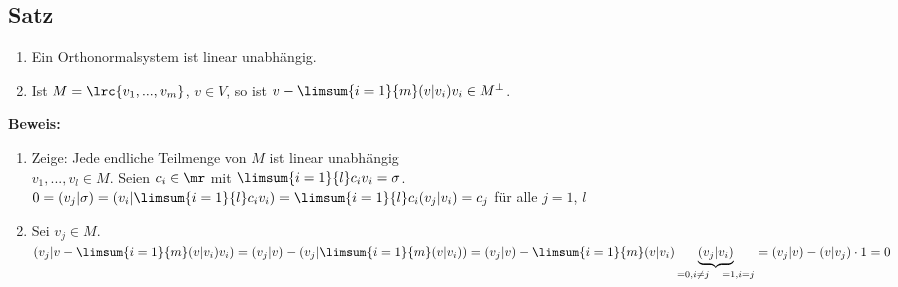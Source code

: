 \subsection{Satz}
	\begin{enumerate}
		\item Ein Orthonormalsystem ist linear unabhängig.
		\item Ist $ M=\lrc{v_1,...,v_m} $, $ v\in V $, so ist $ v-\limsum{i=1}{m}(v|v_i)v_i\in M^\perp $.
	\end{enumerate}
	
	\textbf{Beweis:}
	\begin{enumerate}
		\item Zeige: Jede endliche Teilmenge von $ M $ ist linear unabhängig\\
			$ v_1,...,v_l\in M $. Seien $ c_i\in\mr $ mit $ \limsum{i=1}{l}c_iv_i=\sigma $.\\
			$ 0=(v_j|\sigma)=(v_i|\limsum{i=1}{l}c_iv_i)=\limsum{i=1}{l}c_i(v_j|v_i)=c_j $ für alle $ j=1 $, $ l $
		\item Sei $ v_j\in M $. $ (v_j|v-\limsum{i=1}{m}(v|v_i)v_i)=(v_j|v)-(v_j|\limsum{i=1}{m}(v|v_i))=(v_j|v)-\limsum{i=1}{m}(v|v_i)\underbrace{(v_j|v_i)}_{=0, i\neq j \quad =1, i=j}=(v_j|v)-(v|v_j)\cdot 1=0 $
	\end{enumerate}
